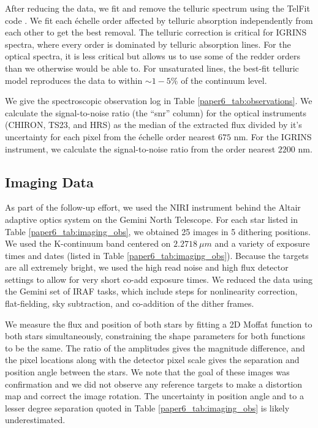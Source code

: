 After reducing the data, we fit and remove the telluric spectrum using the TelFit code \citep{Gullikson2014}. We fit each \'echelle order affected by telluric absorption independently from each other to get the best removal. The telluric correction is critical for IGRINS spectra, where every order is dominated by telluric absorption lines. For the optical spectra, it is less critical but allows us to use some of the redder orders than we otherwise would be able to. For unsaturated lines, the best-fit telluric model reproduces the data to within $\sim 1-5\%$ of the continuum level.

We give the spectroscopic observation log in Table \ref{paper6_tab:observations}. We calculate the signal-to-noise ratio (the ``snr'' column) for the optical instruments (CHIRON, TS23, and HRS) as the median of the extracted flux divided by it's uncertainty for each pixel from the \'echelle order nearest $675$ nm. For the IGRINS instrument, we calculate the signal-to-noise ratio from the order nearest $2200$ nm.


\subsection{Imaging Data}
As part of the follow-up effort, we used the NIRI instrument behind the Altair adaptive optics system on the Gemini North Telescope. For each star listed in Table \ref{paper6_tab:imaging_obs}, we obtained 25 images in 5 dithering positions. We used the K-continuum band centered on $2.2718\ \mu m$ and a variety of exposure times and dates (listed in Table \ref{paper6_tab:imaging_obs}). Because the targets are all extremely bright, we used the high read noise and high flux detector settings to allow for very short co-add exposure times. We reduced the data using the Gemini set of IRAF tasks, which include steps for nonlinearity correction, flat-fielding, sky subtraction, and co-addition of the dither frames. 

We measure the flux and position of both stars by fitting a 2D Moffat function \citep{Moffat1969} to both stars simultaneously, constraining the shape parameters for both functions to be the same. The ratio of the amplitudes gives the magnitude difference, and the pixel locations along with the detector pixel scale gives the separation and position angle between the stars. We note that the goal of these images was confirmation and we did not observe any reference targets to make a distortion map and correct the image rotation. The uncertainty in position angle and to a lesser degree separation quoted in Table \ref{paper6_tab:imaging_obs} is likely underestimated.


